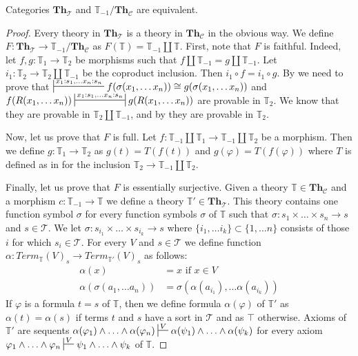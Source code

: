 \documentclass{amsart}
\theoremstyle{definition}
\theoremstyle{remark}
\newcommand{\cat}[1]{\mathbf{#1}}
\newcommand{\Th}{\cat{Th}}
\newcommand{\ThC}{\Th_{\mathcal{C}}}
\newcommand{\ThT}{\Th_{\mathcal{T}}}
\numberwithin{figure}{section}
\begin{document}
\begin{prop}
Categories $\ThT$ and $\mathbb{T}_{-1}/\ThC$ are equivalent.
\end{prop}
\begin{proof}
Every theory in $\ThT$ is a theory in $\ThC$ in the obvious way.
We define $F : \ThT \to \mathbb{T}_{-1}/\ThC$ as $F(\mathbb{T}) = \mathbb{T}_{-1} \amalg \mathbb{T}$.
First, note that $F$ is faithful.
Indeed, let $f,g : \mathbb{T}_1 \to \mathbb{T}_2$ be morphisms such that $f \amalg \mathbb{T}_{-1} = g \amalg \mathbb{T}_{-1}$.
Let $i_1 : \mathbb{T}_2 \to \mathbb{T}_2 \amalg \mathbb{T}_{-1}$ be the coproduct inclusion.
Then $i_1 \circ f = i_1 \circ g$.
By  we need to prove that
$\sststile{}{x_1 : s_1, \ldots x_n : s_n} f(\sigma(x_1, \ldots x_n)) \cong g(\sigma(x_1, \ldots x_n))$ and
$f(R(x_1, \ldots x_n)) \ssststile{}{x_1 : s_1, \ldots x_n : s_n} g(R(x_1, \ldots x_n))$ are provable in $\mathbb{T}_2$.
We know that they are provable in $\mathbb{T}_2 \amalg \mathbb{T}_{-1}$, and by  they are provable in $\mathbb{T}_2$.

Now, let us prove that $F$ is full.
Let $f : \mathbb{T}_{-1} \amalg \mathbb{T}_1 \to \mathbb{T}_{-1} \amalg \mathbb{T}_2$ be a morphism.
Then we define $g : \mathbb{T}_1 \to \mathbb{T}_2$ as $g(t) = T(f(t))$ and $g(\varphi) = T(f(\varphi))$
where $T$ is defined as in  for the inclusion $\mathbb{T}_2 \to \mathbb{T}_{-1} \amalg \mathbb{T}_2$.

Finally, let us prove that $F$ is essentially surjective.
Given a theory $\mathbb{T} \in \ThC$ and a morphism $c : \mathbb{T}_{-1} \to \mathbb{T}$ we define a theory $\mathbb{T}' \in \ThT$.
This theory contains one function symbol $\sigma$ for every function symbols $\sigma$ of $\mathbb{T}$ such that $\sigma : s_1 \times \ldots \times s_n \to s$ and $s \in \mathcal{T}$.
We let $\sigma : s_{i_1} \times \ldots \times s_{i_k} \to s$ where $\{ i_1, \ldots i_k \} \subset \{ 1, \ldots n \}$ consists of those $i$ for which $s_i \in \mathcal{T}$.
For every $V$ and $s \in \mathcal{T}$ we define function $\alpha : Term_\mathbb{T}(V)_s \to Term_{\mathbb{T}'}(V)_s$ as follows:
\begin{align*}
\alpha(x) & = x \text{ if } x \in V \\
\alpha(\sigma(a_1, \ldots a_n)) & = \sigma(\alpha(a_{i_1}), \ldots \alpha(a_{i_k}))
\end{align*}
If $\varphi$ is a formula $t = s$ of $\mathbb{T}$, then we define formula $\alpha(\varphi)$ of $\mathbb{T}'$ as $\alpha(t) = \alpha(s)$
if terms $t$ and $s$ have a sort in $\mathcal{T}$ and as $\top$ otherwise.
Axioms of $\mathbb{T}'$ are sequents $\alpha(\varphi_1) \land \ldots \land \alpha(\varphi_n) \sststile{}{V} \alpha(\psi_1) \land \ldots \land \alpha(\psi_k)$
for every axiom $\varphi_1 \land \ldots \land \varphi_n \sststile{}{V} \psi_1 \land \ldots \land \psi_k$ of $\mathbb{T}$.


\end{proof}
\end{document}
